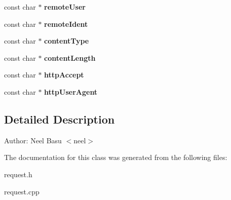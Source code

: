 \begin{CompactItemize}
\item 
const char $\ast$ \textbf{remoteUser}\label{classRawRequest_90c2ae337f995ccf05b40e937ba7ed70}

\item 
const char $\ast$ \textbf{remoteIdent}\label{classRawRequest_7387ab901307383a5751aa9cfa09322f}

\item 
const char $\ast$ \textbf{contentType}\label{classRawRequest_eef499890cd154a6c75196c66ebfc2d1}

\item 
const char $\ast$ \textbf{contentLength}\label{classRawRequest_3e554bfa7db98bea230359f72cacc5b9}

\item 
const char $\ast$ \textbf{httpAccept}\label{classRawRequest_eeac196e4a474a89f92250b58cc612fa}

\item 
const char $\ast$ \textbf{httpUserAgent}\label{classRawRequest_7bd2530ef32a095ad6c06f9e780636cf}

\end{CompactItemize}


\subsection{Detailed Description}
\begin{Desc}
\item[Author:]Neel Basu $<$neel$>$ \end{Desc}


The documentation for this class was generated from the following files:\begin{CompactItemize}
\item 
request.h\item 
request.cpp\end{CompactItemize}
